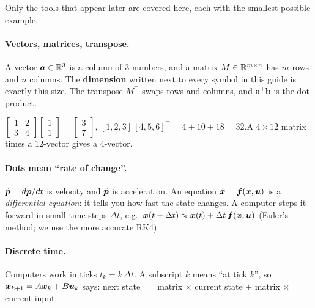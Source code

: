Only the tools that appear later are covered here, each with the smallest possible example.

\paragraph{Vectors, matrices, transpose.} A vector $\bm a\in\mathbb{R}^3$ is a column of 3 numbers, and a matrix
$M\in\mathbb{R}^{m\times n}$ has $m$ rows and $n$ columns. The \textbf{dimension} written next to every symbol in this
guide is exactly this size. The transpose $M^\top$ swaps rows and columns, and $\bm a^\top\bm b$ is the dot product.
\begin{toybox}
$\begin{bmatrix}1&2\\3&4\end{bmatrix}\begin{bmatrix}1\\1\end{bmatrix}=\begin{bmatrix}3\\7\end{bmatrix}$,\qquad
$[1,2,3]\,[4,5,6]^\top=4+10+18=32$.\qquad A $4\times12$ matrix times a 12-vector gives a 4-vector.
\end{toybox}

\paragraph{Dots mean ``rate of change''.} $\dot{\bm{p}}=d\bm{p}/dt$ is velocity and $\ddot{\bm{p}}$ is acceleration. An equation
$\dot{\bm{x}}=\bm{f}(\bm{x},\bm{u})$ is a \emph{differential equation}: it tells you how fast the state changes. A computer
steps it forward in small time steps $\Delta t$, e.g.\ $\bm{x}(t+\Delta t)\approx\bm{x}(t)+\Delta t\,\bm{f}(\bm{x},\bm{u})$
(Euler's method; we use the more accurate RK4).

\paragraph{Discrete time.} Computers work in ticks $t_k=k\,\Delta t$. A subscript $k$ means ``at tick $k$'', so
$\bm{x}_{k+1}=A\bm{x}_k+B\bm{u}_k$ says: next state $=$ matrix $\times$ current state $+$ matrix $\times$ current input.

